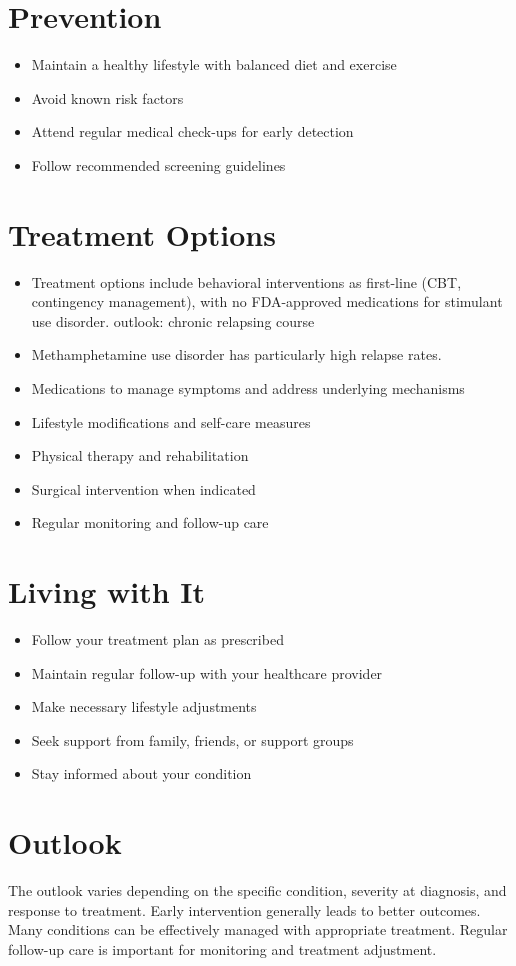 \section{Prevention}
\begin{itemize}[noitemsep]
  \item Maintain a healthy lifestyle with balanced diet and exercise
  \item Avoid known risk factors
  \item Attend regular medical check-ups for early detection
  \item Follow recommended screening guidelines
\end{itemize}
\section{Treatment Options}
\begin{itemize}[noitemsep]
  \item Treatment options include behavioral interventions as first-line (CBT, contingency management), with no FDA-approved medications for stimulant use disorder. outlook: chronic relapsing course
  \item Methamphetamine use disorder has particularly high relapse rates.
  \item Medications to manage symptoms and address underlying mechanisms
  \item Lifestyle modifications and self-care measures
  \item Physical therapy and rehabilitation
  \item Surgical intervention when indicated
  \item Regular monitoring and follow-up care
\end{itemize}
\section{Living with It}
\begin{itemize}[noitemsep]
  \item Follow your treatment plan as prescribed
  \item Maintain regular follow-up with your healthcare provider
  \item Make necessary lifestyle adjustments
  \item Seek support from family, friends, or support groups
  \item Stay informed about your condition
\end{itemize}
\section{Outlook}
The outlook varies depending on the specific condition, severity at diagnosis, and response to treatment. Early intervention generally leads to better outcomes. Many conditions can be effectively managed with appropriate treatment. Regular follow-up care is important for monitoring and treatment adjustment.
